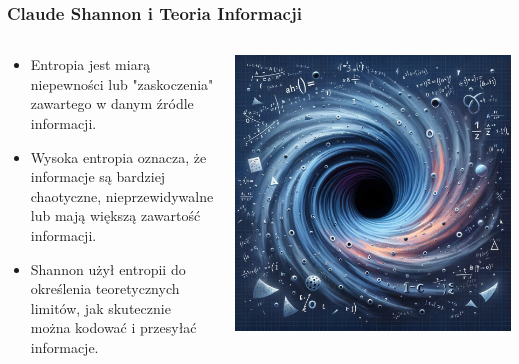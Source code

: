 \documentclass[smaller]{beamer}
\begin{document}

\begin{frame}
\frametitle{Claude Shannon i Teoria Informacji}

\begin{columns}
    \begin{column}{0.6\textwidth}
        \begin{itemize}
            \item Entropia jest miarą niepewności lub "zaskoczenia" zawartego w danym źródle informacji.
            \item Wysoka entropia oznacza, że informacje są bardziej chaotyczne, nieprzewidywalne lub mają większą zawartość informacji.
            \item Shannon użył entropii do określenia teoretycznych limitów, jak skutecznie można kodować i przesyłać informacje.
        \end{itemize}
    \end{column}

    \begin{column}{0.4\textwidth}
        \includegraphics[width=\textwidth]{../manifest/entropy.png} %
    \end{column}
\end{columns}
\end{frame}
\end{document}
